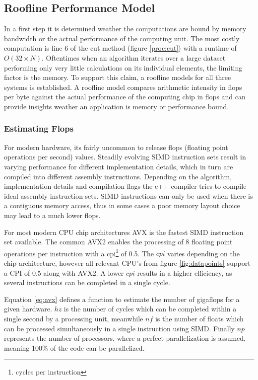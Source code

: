 \documentclass[]{article}
\begin{document}
\subsection{Roofline Performance Model} \label{sec:roof}

In a first step it is determined weather the computations are bound by memory bandwidth or the actual performance of the computing unit. The most costly computation is line 6 of the cut method (figure \ref{proc:cut}) with a runtime of $O(32 \times N)$. Oftentimes when an algorithm iterates over a large dataset performing only very little calculations on its individual elements, the limiting factor is the memory. To support this claim, a roofline models for all three systems is established. A roofline model compares arithmetic intensity in flops per byte against the actual performance of the computing chip in flops and can provide insights weather an application is memory or performance bound. 

\subsubsection{Estimating Flops}

For modern hardware, its fairly uncommon to release flops (floating point operations per second) values. Steadily evolving SIMD instruction sets result in varying performance for different implementation details, which in turn are compiled into different assembly instructions. Depending on the algorithm, implementation details and compilation flags the c++ compiler tries to compile ideal assembly instruction sets. SIMD instructions can only be used when there is a contiguous memory access, thus in some cases a poor memory layout choice may lead to a much lower flops. 

For most modern CPU chip architectures AVX is the fastest SIMD instruction set available. The common AVX2 enables the processing of 8 floating point operations per instruction with a cpi\footnote{cycles per instruction} of 0.5. The $cpi$ varies depending on the chip architecture, however all relevant CPU's from figure \ref{fig:datapoints} support a CPI of 0.5 along with AVX2. A lower $cpi$ results in a higher efficiency, as several instructions can be completed in a single cycle. 

Equation \ref{eq:avx} defines a function to estimate the number of gigaflops for a given hardware. $hz$ is the number of cycles which can be completed within a single second by a processing unit, meanwhile $nf$ is the number of floats which can be processed simultaneously in a single instruction using SIMD. Finally $np$ represents the number of processors, where a perfect parallelization is assumed, meaning 100\% of the code can be parallelized.
\end{document}
